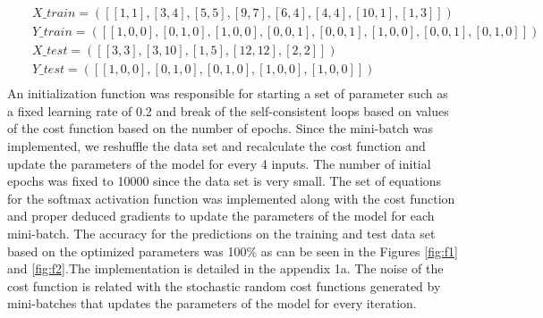 \documentclass{article}
\begin{document}
\begin{eqnarray}
&&X\_train = ([[1,1],[3,4],[5,5],[9,7],[6,4],[4,4],[10,1],[1,3]]) \\
&&Y\_train = ([[1,0,0],[0,1,0],[1,0,0],[0,0,1],[0,0,1],[1,0,0],[0,0,1],[0,1,0]])\\
&&X\_test = ([[3,3],[3,10],[1,5],[12,12],[2,2]])\\
&&Y\_test = ([[1,0,0],[0,1,0],[0,1,0],[1,0,0],[1,0,0]])\\
\end{eqnarray}
An initialization function was responsible for starting a set of parameter such as a fixed learning rate of 0.2 and break of the self-consistent loops based on values of the cost function based on the number of epochs. Since the mini-batch was implemented, we reshuffle the data set and recalculate the cost function and update the parameters of the model for every 4 inputs. The number of initial epochs was fixed to 10000 since the data set is very small. The set of equations for the softmax activation function was implemented along with the cost function and proper deduced gradients to update the parameters of the model for each mini-batch. The accuracy for the predictions on the training and test data set based on the optimized parameters was 100$\%$ as can be seen in the Figures \ref{fig:f1} and \ref{fig:f2}.The implementation is detailed in the appendix 1a. The noise of the cost function is related with the stochastic random cost functions generated by mini-batches that updates the parameters of the model for every iteration.
\end{document}

